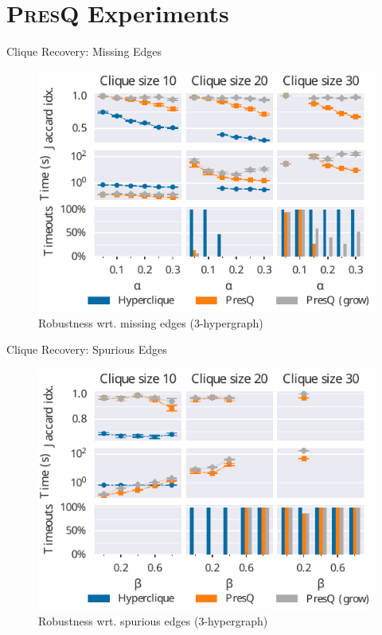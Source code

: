 \documentclass[10pt]{beamer}
\newcommand{\PresQ}[0]{\textsc{PresQ}\xspace}
\begin{document}
\section{\PresQ Experiments}

\begin{frame}{Clique Recovery: Missing Edges}
    \begin{figure}
        \centering
        \includegraphics{3hyper_alpha}
        \caption{Robustness wrt. missing edges (3-hypergraph)}
    \end{figure}
\end{frame}

\begin{frame}{Clique Recovery: Spurious Edges}
    \begin{figure}
        \centering
        \includegraphics{3hyper_beta}
        \caption{Robustness wrt. spurious edges (3-hypergraph)}
    \end{figure}
\end{frame}
\end{document}
